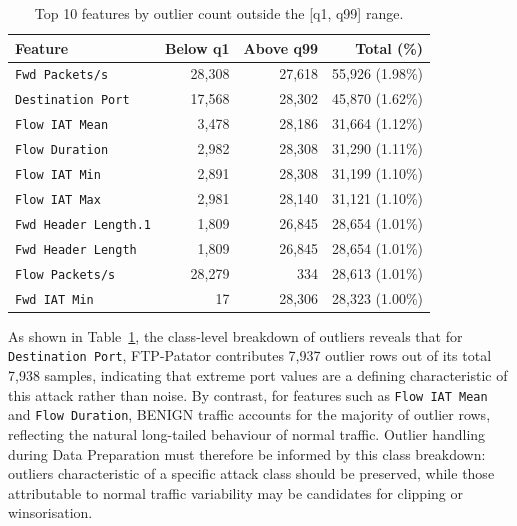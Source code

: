 \documentclass[12pt,a4paper]{article}
\begin{document}
\begin{table}[H]
    \centering
    \caption{Top 10 features by outlier count outside the [q1, q99] range.}
    \label{tab:outliers}
    \begin{tabular}{|l|r|r|r|}
        \hline
        \textbf{Feature}             & \textbf{Below q1} & \textbf{Above q99} & \textbf{Total (\%)} \\
        \hline
        \texttt{Fwd Packets/s}       & 28,308            & 27,618             & 55,926 (1.98\%)     \\
        \hline
        \texttt{Destination Port}    & 17,568            & 28,302             & 45,870 (1.62\%)     \\
        \hline
        \texttt{Flow IAT Mean}       & 3,478             & 28,186             & 31,664 (1.12\%)     \\
        \hline
        \texttt{Flow Duration}       & 2,982             & 28,308             & 31,290 (1.11\%)     \\
        \hline
        \texttt{Flow IAT Min}        & 2,891             & 28,308             & 31,199 (1.10\%)     \\
        \hline
        \texttt{Flow IAT Max}        & 2,981             & 28,140             & 31,121 (1.10\%)     \\
        \hline
        \texttt{Fwd Header Length.1} & 1,809             & 26,845             & 28,654 (1.01\%)     \\
        \hline
        \texttt{Fwd Header Length}   & 1,809             & 26,845             & 28,654 (1.01\%)     \\
        \hline
        \texttt{Flow Packets/s}      & 28,279            & 334                & 28,613 (1.01\%)     \\
        \hline
        \texttt{Fwd IAT Min}         & 17                & 28,306             & 28,323 (1.00\%)     \\
        \hline
    \end{tabular}
\end{table}

As shown in Table~\ref{tab:outliers}, the class-level breakdown of outliers reveals
that for \texttt{Destination Port}, FTP-Patator contributes 7,937 outlier rows out of
its total 7,938 samples, indicating that extreme port values are a defining
characteristic of this attack rather than noise. By contrast, for features such as
\texttt{Flow IAT Mean} and \texttt{Flow Duration}, BENIGN traffic accounts for the
majority of outlier rows, reflecting the natural long-tailed behaviour of normal traffic.
Outlier handling during Data Preparation must therefore be informed by this class
breakdown: outliers characteristic of a specific attack class should be preserved, while
those attributable to normal traffic variability may be candidates for clipping or
winsorisation.
\end{document}
